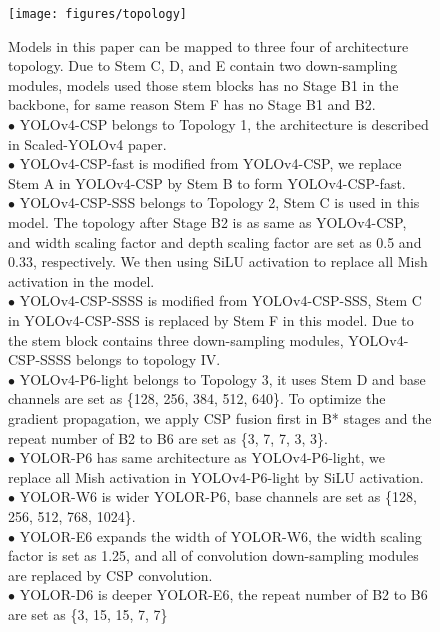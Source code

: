 \documentclass[10pt,twocolumn,letterpaper]{article}
\begin{document}
\begin{figure}[h]
\begin{center}
	\texttt{[image: figures/topology]}
\end{center}
\caption{Models in this paper can be mapped to three four of architecture topology. Due to Stem C, D, and E contain two down-sampling modules, models used those stem blocks has no Stage B1 in the backbone, for same reason Stem F has no Stage B1 and B2. \\ $\bullet$ YOLOv4-CSP belongs to Topology 1, the architecture is described in Scaled-YOLOv4 paper. \\ $\bullet$ YOLOv4-CSP-fast is modified from YOLOv4-CSP, we replace Stem A in YOLOv4-CSP by Stem B to form YOLOv4-CSP-fast. \\ $\bullet$ YOLOv4-CSP-SSS belongs to Topology 2, Stem C is used in this model. The topology after Stage B2 is as same as YOLOv4-CSP, and width scaling factor and depth scaling factor are set as 0.5 and 0.33, respectively. We then using SiLU activation to replace all Mish activation in the model. \\ $\bullet$ YOLOv4-CSP-SSSS is modified from YOLOv4-CSP-SSS, Stem C in YOLOv4-CSP-SSS is replaced by Stem F in this model. Due to the stem block contains three down-sampling modules, YOLOv4-CSP-SSSS belongs to topology IV. \\ $\bullet$ YOLOv4-P6-light belongs to Topology 3, it uses Stem D and base channels are set as \{128, 256, 384, 512, 640\}. To optimize the gradient propagation, we apply CSP fusion first in B* stages and the repeat number of B2 to B6 are set as \{3, 7, 7, 3, 3\}. \\ $\bullet$ YOLOR-P6 has same architecture as YOLOv4-P6-light, we replace all Mish activation in YOLOv4-P6-light by SiLU activation. \\ $\bullet$ YOLOR-W6 is wider YOLOR-P6, base channels are set as \{128, 256, 512, 768, 1024\}. \\ $\bullet$ YOLOR-E6 expands the width of YOLOR-W6, the width scaling factor is set as 1.25, and all of convolution down-sampling modules are replaced by CSP convolution. \\ $\bullet$ YOLOR-D6 is deeper YOLOR-E6, the repeat number of B2 to B6 are set as \{3, 15, 15, 7, 7\}}
\label{fig:topo}
\end{figure}
\end{document}

